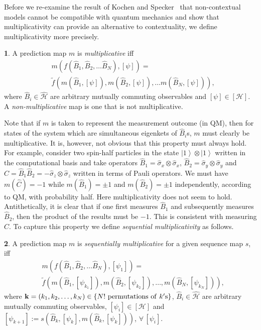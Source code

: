 \documentclass[british,aps,prl,superscriptaddress,nofootinbib,times,reprint]{revtex4-1}
\theoremstyle{plain}
\theoremstyle{definition}
\newtheorem{defn}{\protect\definitionname}
\theoremstyle{remark}
\theoremstyle{remark}
\theoremstyle{remark}
\theoremstyle{plain}
\theoremstyle{plain}
\theoremstyle{plain}
\theoremstyle{definition}
\theoremstyle{definition}
\providecommand{\definitionname}{Definition}
\begin{document}
Before we re-examine the result of Kochen and
Specker~\cite{KochenSpecker} that non-contextual
models cannot be compatible with quantum
mechanics and show that multiplicativity can provide an
alternative to contextuality, we define
multiplicativity more precisely.
\begin{defn}
A prediction map $m$ is \emph{multiplicative} iff
\begin{align*} &
m(f(\hat{B}_{1},\hat{B}_{2},\dots\hat{B}_{N}),[\psi])
= \\ & \tilde
f(m(\hat{B}_{1},[\psi]),m(\hat{B}_{2},[\psi]),\dots
m(\hat{B}_{N},[\psi])), \end{align*}
where $\hat{B}_{i}\in\hat{\mathcal{H}}$ are
arbitrary mutually commuting observables and
$[\psi]\in[\mathcal{H}]$. A
\emph{non-multiplicative} map is one that is not
multiplicative.  
\end{defn} 
Note that if $m$ is taken to represent the
measurement outcome (in QM), then for states of
the system which are simultaneous eigenkets of
$\hat{B}_{i}$s, $m$ must clearly be
multiplicative. It is, however, not obvious that
this property must always hold. For example,
consider two spin-half particles in the state 
$\left|1\right\rangle \otimes\left|1\right\rangle
$ written in the computational basis and take
operators 
$\hat{B}_{1}=\hat{\sigma}_{x}\otimes\hat{\sigma}_{x}$,
$\hat{B}_{2}=\hat{\sigma}_{y}\otimes\hat{\sigma}_{y}$
and
$\hat{C}=\hat{B}_{1}\hat{B}_{2}=-\hat{\sigma}_{z}\otimes\hat{\sigma}_{z}$
written in terms of Pauli operators.
We must have $m(\hat{C})=-1$ while
$m(\hat{B}_{1})=\pm1$ and $m(\hat{B}_{2})=\pm1$
independently, according to QM, with probability
half. Here multiplicativity does not seem to hold.
Antithetically, it is clear that if one first
measures $\hat{B}_{1}$ and subsequently measures
$\hat{B}_{2}$, then the product of the results
must be $-1$. This is consistent with measuring
$\hat{C}$. To capture this property we define
\emph{sequential multiplicativity} as follows.
\begin{defn} 
A prediction map $m$ is
\emph{sequentially multiplicative} for a given
sequence map $s$, iff \begin{align*}
&m(f(\hat{B}_{1},\hat{B}_{2},\dots\hat{B}_{N}),[\psi_{1}])=\\
&\tilde
f(m(\hat{B}_{1},[\psi_{k_{1}}]),m(\hat{B}_{2},[\psi_{k_{2}}]),\dots,m(\hat{B}_{N},[\psi_{k_{N}}])),
\end{align*} 
where
$\mathbf{k}=(k_{1},k_{2},\dots,k_{N})\in\{
N! {\rm ~permutations~of~}  k'{\rm s}
\}$, $\hat{B}_{i}\in\hat{\mathcal{H}}$ are
arbitrary mutually commuting observables,
$[\psi_{i}]\in[\mathcal{H}]$ and
$[\psi_{k+1}] :=
s(\hat{B}_{k},[\psi_{k}],m(\hat{B}_{k},[\psi_{k}]))$,
$\forall\,[\psi_{i}]$.  
\label{defn:seqnMltpl}\end{defn} 
\end{document}

